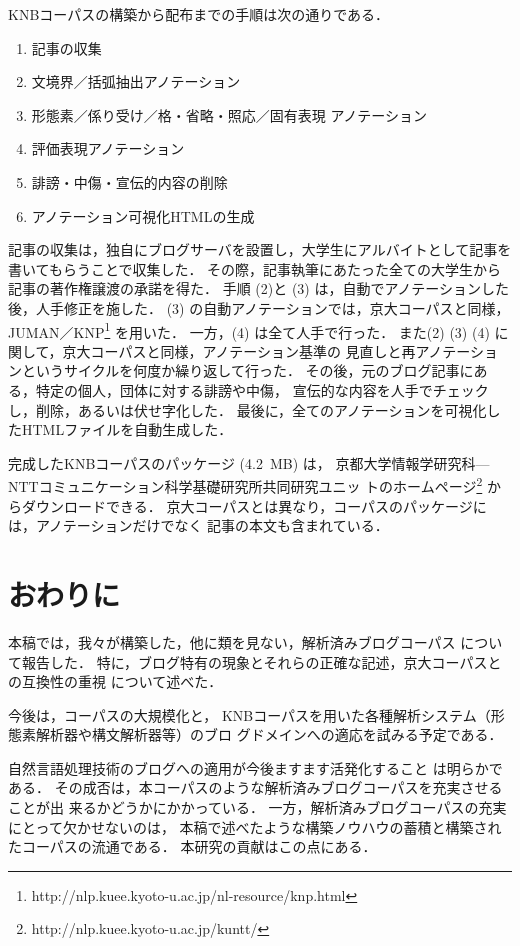 \documentclass[japanese]{jnlp_JS2.0}
\begin{document}
KNBコーパスの構築から配布までの手順は次の通りである．

\begin{enumerate}
 \item 記事の収集
 \item 文境界／括弧抽出アノテーション
 \item 形態素／係り受け／格・省略・照応／固有表現
       アノテーション
 \item 評価表現アノテーション
 \item 誹謗・中傷・宣伝的内容の削除
 \item アノテーション可視化HTMLの生成
\end{enumerate}

記事の収集は，独自にブログサーバを設置し，大学生にアルバイトとして記事を
書いてもらうことで収集した．
その際，記事執筆にあたった全ての大学生から記事の著作権譲渡の承諾を得た．
手順 (2)と (3) は，自動でアノテーションした後，人手修正を施した．
(3) の自動アノテーションでは，京大コーパスと同様，JUMAN／KNP\footnote{http://nlp.kuee.kyoto-u.ac.jp/nl-resource/knp.html} を用いた．
一方，(4) は全て人手で行った．
また(2) (3) (4) に関して，京大コーパスと同様，アノテーション基準の
見直しと再アノテーションというサイクルを何度か繰り返して行った．
その後，元のブログ記事にある，特定の個人，団体に対する誹謗や中傷，
宣伝的な内容を人手でチェックし，削除，あるいは伏せ字化した．
最後に，全てのアノテーションを可視化したHTMLファイルを自動生成した．

完成したKNBコーパスのパッケージ (4.2~MB) は，
京都大学情報学研究科—NTTコミュニケーション科学基礎研究所共同研究ユニッ
トのホームページ\footnote{http://nlp.kuee.kyoto-u.ac.jp/kuntt/}
からダウンロードできる．
京大コーパスとは異なり，コーパスのパッケージには，アノテーションだけでなく
記事の本文も含まれている．



\section{おわりに}
\label{sec:conclusion}

本稿では，我々が構築した，他に類を見ない，解析済みブログコーパス
について報告した．
特に，ブログ特有の現象とそれらの正確な記述，京大コーパスとの互換性の重視
について述べた．

今後は，コーパスの大規模化と，
KNBコーパスを用いた各種解析システム（形態素解析器や構文解析器等）のブロ
グドメインへの適応を試みる予定である．

自然言語処理技術のブログへの適用が今後ますます活発化すること
は明らかである．
その成否は，本コーパスのような解析済みブログコーパスを充実させることが出
来るかどうかにかかっている．
一方，解析済みブログコーパスの充実にとって欠かせないのは，
本稿で述べたような構築ノウハウの蓄積と構築されたコーパスの流通である．
本研究の貢献はこの点にある．
\end{document}
